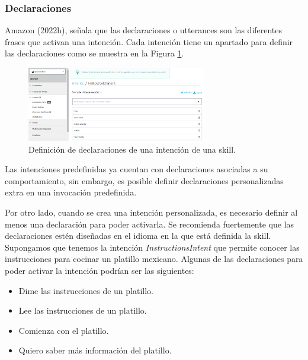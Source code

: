 
\subsubsection{Declaraciones}
\label{DeclaracionescapIV}

Amazon (2022h), señala que las declaraciones o utterances son las diferentes frases que activan una intención. Cada intención tiene un apartado para definir las declaraciones como se muestra en la Figura \ref{fig:47}.

\begin{figure}[H]
  \centering
  \includegraphics[width=0.70\textwidth]{Cap4/Figuras/Declaraciones.png}
  \caption{Definición de declaraciones de una intención de una skill.}
  \label{fig:47}
\end{figure}

Las intenciones predefinidas ya cuentan con declaraciones asociadas a su comportamiento, sin embargo, es posible definir declaraciones personalizadas extra en una invocación predefinida.

Por otro lado, cuando se crea una intención personalizada, es necesario definir al menos una declaración para poder activarla. Se recomienda fuertemente que las declaraciones estén diseñadas en el idioma en la que está definida la skill. Supongamos que tenemos la intención \textit{InstructionsIntent} que permite conocer las instrucciones para cocinar un platillo mexicano. Algunas de las declaraciones para poder activar la intención podrían ser las siguientes:

\begin{itemize}
  \item Dime las instrucciones de un platillo.
  \item Lee las instrucciones de un platillo.
  \item Comienza con el platillo.
  \item Quiero saber más información del platillo.
\end{itemize}

